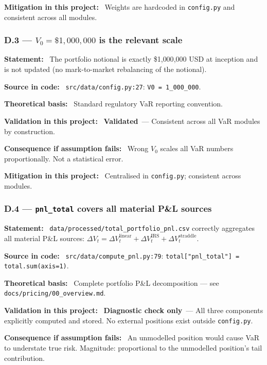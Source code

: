 \documentclass[11pt,a4paper]{article}
\newcommand{\asmfield}[1]{\medskip\noindent\textbf{#1:}\ }
\newcommand{\code}[1]{\texttt{#1}}
\newcommand{\validated}{\textbf{Validated}}
\newcommand{\diagnostic}{\textbf{Diagnostic check only}}
\begin{document}
\asmfield{Mitigation in this project}
Weights are hardcoded in \code{config.py} and consistent across all modules.

\subsubsection{D.3 --- $V_0 = \$1{,}000{,}000$ is the relevant scale}\label{asm:D3}

\asmfield{Statement}
The portfolio notional is exactly \$1{,}000{,}000 USD at inception and is
not updated (no mark-to-market rebalancing of the notional).

\asmfield{Source in code}
\code{src/data/config.py:27}: \lstinline|V0 = 1_000_000|.

\asmfield{Theoretical basis}
Standard regulatory VaR reporting convention.

\asmfield{Validation in this project}
\validated\ --- Consistent across all VaR modules by construction.

\asmfield{Consequence if assumption fails}
Wrong $V_0$ scales all VaR numbers proportionally. Not a statistical error.

\asmfield{Mitigation in this project}
Centralised in \code{config.py}; consistent across modules.

\subsubsection{D.4 --- \texttt{pnl\_total} covers all material P\&L sources}\label{asm:D4}

\asmfield{Statement}
\code{data/processed/total\_portfolio\_pnl.csv} correctly aggregates all
material P\&L sources: $\Delta V_t = \Delta V_t^{\text{linear}} +
\Delta V_t^{\text{IRS}} + \Delta V_t^{\text{straddle}}$.

\asmfield{Source in code}
\code{src/data/compute\_pnl.py:79}: \lstinline|total["pnl_total"] = total.sum(axis=1)|.

\asmfield{Theoretical basis}
Complete portfolio P\&L decomposition --- see \code{docs/pricing/00\_overview.md}.

\asmfield{Validation in this project}
\diagnostic\ --- All three components explicitly computed and stored. No
external positions exist outside \code{config.py}.

\asmfield{Consequence if assumption fails}
An unmodelled position would cause VaR to understate true risk.
Magnitude: proportional to the unmodelled position's tail contribution.
\end{document}
